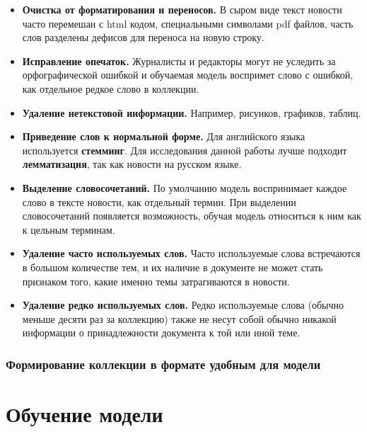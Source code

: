 \begin{itemize}
    \item\textbf{Очистка от форматирования и переносов.} В сыром виде текст новости часто перемешан с html кодом, специальными символами pdf файлов, часть слов разделены дефисов для переноса на новую строку.
    \item\textbf{Исправление опечаток.} Журналисты и редакторы могут не уследить за орфографической ошибкой и обучаемая модель воспримет слово с ошибкой, как отдельное редкое слово в коллекции.
    \item\textbf{Удаление нетекстовой информации.} Например, рисунков, графиков, таблиц.
    \item\textbf{Приведение слов к нормальной форме.} Для английского языка используется \textbf{стемминг}. Для исследования данной работы лучше подходит \textbf{лемматизация}, так как новости на русском языке.
    \item\textbf{Выделение словосочетаний.} По умолчанию модель воспринимает каждое слово в тексте новости, как отдельный термин. При выделении словосочетаний появляется возможность, обучая модель относиться к ним как к цельным терминам.
    \item\textbf{Удаление часто используемых слов.} Часто используемые слова встречаются в большом количестве тем, и их наличие в документе не может стать признаком того, какие именно темы затрагиваются в новости. 
    \item\textbf{Удаление редко используемых слов.} Редко используемые слова (обычно меньше десяти раз за коллекцию) также не несут собой обычно никакой информации о принадлежности документа к той или иной теме.
\end{itemize}
%
\subsubsection{Формирование коллекции в формате удобным для модели}

%
\section{Обучение модели}

